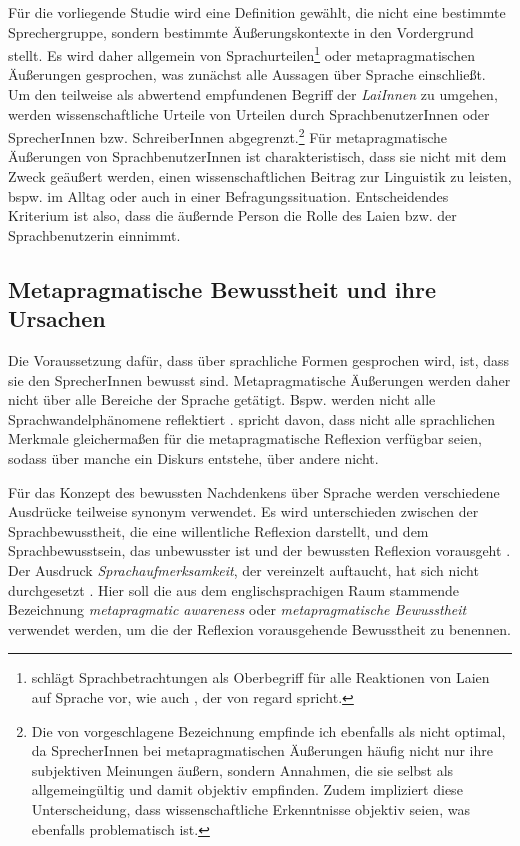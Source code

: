 Für die vorliegende Studie wird eine Definition gewählt, die nicht eine bestimmte Sprechergruppe, sondern bestimmte Äußerungskontexte in den Vordergrund stellt. 
Es wird daher allgemein von Sprachurteilen\footnote{\citet[31]{Cuonz.2014} schl{\"a}gt Sprachbetrachtungen als Oberbegriff f{\"u}r alle {\glqq}Reaktionen von Laien auf Sprache{\grqq} vor, wie auch \citet[4]{Preston2010b}, der von \glqq regard\grqq{} spricht.} oder metapragmatischen Äußerungen gesprochen, was zunächst alle Aussagen über Sprache einschließt.
Um den teilweise als abwertend empfundenen Begriff der \textit{LaiInnen} zu umgehen, werden wissenschaftliche Urteile von Urteilen durch SprachbenutzerInnen oder SprecherInnen bzw. {Schrei\-berIn\-nen} abgegrenzt.\footnote{Die von \citet[15]{Konig.2014} vorgeschlagene Bezeichnung  empfinde ich ebenfalls als nicht optimal, da SprecherInnen bei metapragmatischen Äußerungen häufig nicht nur ihre subjektiven Meinungen äußern, sondern Annahmen, die sie selbst als allgemeingültig und damit objektiv empfinden. Zudem impliziert diese Unterscheidung, dass wissenschaftliche Erkenntnisse objektiv seien, was ebenfalls problematisch ist.} 
Für metapragmatische Äußerungen von SprachbenutzerInnen ist charakteristisch, dass sie nicht mit dem Zweck geäußert werden, einen wissenschaftlichen Beitrag zur Linguistik zu leisten, bspw. im Alltag oder auch in einer Befragungssituation. 
Entscheidendes Kriterium ist also, dass die äußernde Person die Rolle des Laien bzw. der Sprachbenutzerin einnimmt. 
\subsection{Metapragmatische Bewusstheit und ihre Ursachen}
\label{sec:MetapragmatischeBewusstheit}
Die Voraussetzung dafür, dass über sprachliche Formen gesprochen wird, ist, dass sie den SprecherInnen bewusst sind. 
Metapragmatische Äußerungen werden daher nicht über alle Bereiche der Sprache getätigt. 
Bspw. werden nicht alle Sprachwandelphänomene reflektiert \citep[s.][233]{Labov1973}.
\citet[45]{Preston2004} spricht davon, dass nicht alle sprachlichen Merkmale gleichermaßen für die metapragmatische Reflexion verfügbar seien, sodass über manche ein Diskurs entstehe, über andere nicht. 

Für das Konzept des bewussten Nachdenkens über Sprache werden verschiedene Ausdrücke teilweise synonym verwendet. 
Es wird unterschieden zwischen der Sprachbewusstheit, die eine willentliche Reflexion darstellt, und dem Sprachbewusstsein, das unbewusster ist und der bewussten Reflexion vorausgeht \citep[s.][]{Spitta.2000}. 
Der Ausdruck \textit{Sprachaufmerksamkeit}, der vereinzelt auftaucht, hat sich nicht durchgesetzt \citep[s.][134]{Ossner2007}. 
Hier soll die aus dem englischsprachigen Raum stammende Bezeichnung \textit{metapragmatic awareness} oder \textit{metapragmatische Bewusstheit} verwendet werden, um die der Reflexion vorausgehende Bewusstheit zu benennen. 

